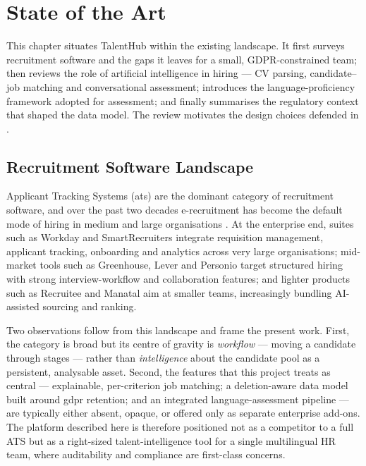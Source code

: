 ﻿\chapter{State of the Art}
\label{cap:state-of-the-art}

This chapter situates TalentHub within the existing landscape. It first
surveys recruitment software and the gaps it leaves for a small,
GDPR-constrained team; then reviews the role of artificial intelligence in
hiring --- CV parsing, candidate--job matching and conversational assessment;
introduces the language-proficiency framework adopted for assessment; and
finally summarises the regulatory context that shaped the data model. The
review motivates the design choices defended in .


\section{Recruitment Software Landscape}
\label{sec:sota-recruitment}

Applicant Tracking Systems (\gls{ats}) are the dominant category of
recruitment software, and over the past two decades e-recruitment has become
the default mode of hiring in medium and large organisations
\parencite{Holm2012Erecruitment}. At the enterprise end,
suites such as Workday and
SmartRecruiters \parencite{WorkdayRecruiting,SmartRecruiters} integrate requisition
management, applicant tracking,
onboarding and analytics across very large organisations; mid-market tools
such as Greenhouse, Lever and Personio
\parencite{Greenhouse,Lever,Personio} target structured hiring with strong
interview-workflow and collaboration features; and lighter products such as
Recruitee and Manatal \parencite{Recruitee,Manatal} aim at smaller teams, increasingly
bundling AI-assisted sourcing and ranking.

Two observations follow from this landscape and frame the present work.
First, the category is broad but its centre of gravity is \emph{workflow}
--- moving a candidate through stages --- rather than \emph{intelligence}
about the candidate pool as a persistent, analysable asset. Second, the
features that this project treats as central --- explainable, per-criterion
job matching; a deletion-aware data model built around \gls{gdpr} retention;
and an integrated language-assessment pipeline --- are typically either
absent, opaque, or offered only as separate enterprise add-ons. The platform
described here is therefore positioned not as a competitor to a full ATS but
as a right-sized talent-intelligence tool for a single multilingual HR team,
where auditability and compliance are first-class concerns.

